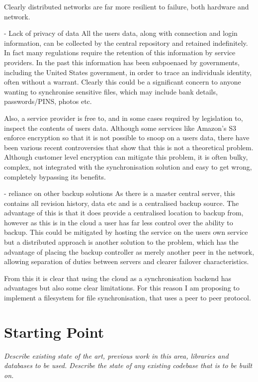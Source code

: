 Clearly distributed networks are far more resilient to failure, both hardware and network.

- Lack of privacy of data
All the users data, along with connection and login information, can be collected by the central
repository and retained indefinitely. In fact many regulations require the retention of this
information by service providers. In the past this information has been subpoenaed by governments,
including the United States government, in order to trace an individuals identity, often without
a warrant. Clearly this could be a significant concern to anyone wanting to synchronise sensitive
files, which may include bank details, passwords/PINS, photos etc.

Also, a service provider is free to, and in some cases required by legislation to, inspect the
contents of users data. Although some services like Amazon's S3 enforce encryption so that it is
not possible to snoop on a users data, there have been various recent controversies that show that
this is not a theoretical problem. Although customer level encryption can mitigate this problem,
it is often bulky, complex, not integrated with the synchronisation solution and easy to get
wrong, completely bypassing its benefits.

- reliance on other backup solutions
As there is a master central server, this contains all revision history, data etc and is a
centralised backup source. The advantage of this is that it does provide a centralised location to
backup from, however as this is in the cloud a user has far less control over the ability to
backup. This could be mitigated by hosting the service on the users own service but a distributed
approach is another solution to the problem, which has the advantage of placing the backup
controller as merely another peer in the network, allowing separation of duties between servers
and clearer failover characteristics.

From this it is clear that using the cloud as a synchronisation backend has advantages but also
some clear limitations. For this reason I am proposing to implement a filesystem for file
synchronisation, that uses a peer to peer protocol.


\section*{Starting Point}

{\em Describe existing state of the art, previous work in this area, libraries and databases to be used.
Describe the state of any existing codebase that is to be built on.  }


